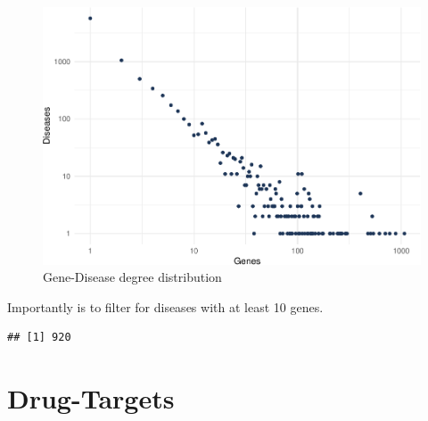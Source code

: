 \documentclass[
]{book}
\newenvironment{Shaded}{\begin{snugshade}}{\end{snugshade}}
\newcommand{\AttributeTok}[1]{\textcolor[rgb]{0.77,0.63,0.00}{#1}}
\newcommand{\DecValTok}[1]{\textcolor[rgb]{0.00,0.00,0.81}{#1}}
\newcommand{\FunctionTok}[1]{\textcolor[rgb]{0.00,0.00,0.00}{#1}}
\newcommand{\NormalTok}[1]{#1}
\newcommand{\SpecialCharTok}[1]{\textcolor[rgb]{0.00,0.00,0.00}{#1}}
\begin{document}
\begin{figure}
\centering
\includegraphics{NetMed_files/figure-latex/unnamed-chunk-11-1.pdf}
\caption{\label{fig:unnamed-chunk-11}Gene-Disease degree distribution}
\end{figure}

Importantly is to filter for diseases with at least 10 genes.

\begin{Shaded}
\end{Shaded}

\begin{verbatim}
## [1] 920
\end{verbatim}

\hypertarget{drug-targets}{%
\section{Drug-Targets}\label{drug-targets}}
\end{document}

